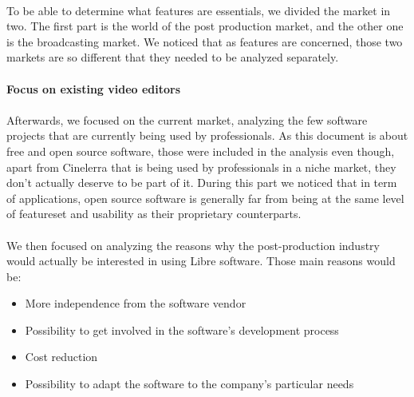 \paragraph{}

To be able to determine what features are essentials, we divided the
market in two. The first part is the world of the post production market,
and the other one is the broadcasting market. We noticed that as features
are concerned, those two markets are so different that they needed to
be analyzed separately.

\paragraph{Focus on existing video editors}

\paragraph{}

Afterwards, we focused on the current market, analyzing the few software
projects that are currently being used by professionals. As this
document is about free and open source software, those were included
in the analysis even though, apart from Cinelerra that is being used
by professionals in a niche market, they don't actually deserve to be
part of it. During this part we noticed that in term of applications,
open source software is generally far from being at the same level of
featureset and usability as their proprietary counterparts.

\paragraph{}

We then focused on analyzing the reasons why the post-production industry
would actually be interested in using Libre software. Those main reasons
would be:

\begin{itemize}

  \item {More independence from the software vendor}

  \item {Possibility to get involved in the software's development
  process}

   \item {Cost reduction}

   \item {Possibility to adapt the software to the company's particular
   needs}

\end{itemize}

